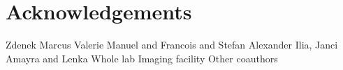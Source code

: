 \chapter*{Acknowledgements}
Zdenek
Marcus
Valerie
Manuel and Francois and Stefan
Alexander
Ilia, Janci
Amayra and Lenka
Whole lab
Imaging facility
Other coauthors
